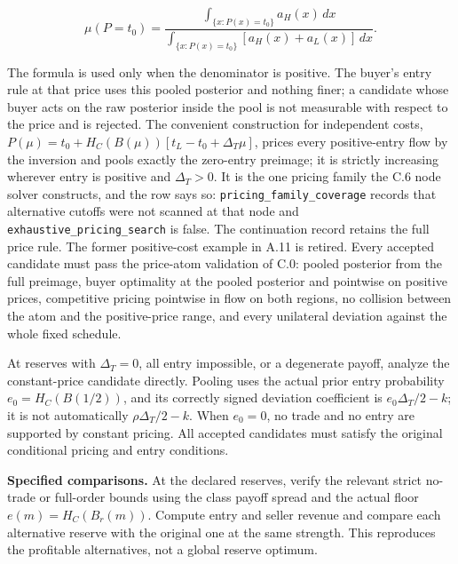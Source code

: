 \documentclass[
  11pt,
]{article}
\begin{document}
\[
\mu(P=t_0)=\frac{\int_{\{x:P(x)=t_0\}}a_H(x)\,dx}
{\int_{\{x:P(x)=t_0\}}[a_H(x)+a_L(x)]\,dx}.
\tag{OA.79}\label{eq:oa-oa-79}
\]

The formula is used only when the denominator is positive. The buyer's
entry rule at that price uses this pooled posterior and nothing finer; a
candidate whose buyer acts on the raw posterior inside the pool is not
measurable with respect to the price and is rejected. The convenient
construction for independent costs,
\(P(\mu)=t_0+H_C(B(\mu))[t_L-t_0+\Delta_T\mu]\), prices every
positive-entry flow by the inversion and pools exactly the zero-entry
preimage; it is strictly increasing wherever entry is positive and
\(\Delta_T>0\). It is the one pricing family the C.6 node solver
constructs, and the row says so: \texttt{pricing\_family\_coverage}
records that alternative cutoffs were not scanned at that node and
\texttt{exhaustive\_pricing\_search} is false. The continuation record
retains the full price rule. The former positive-cost example in A.11 is
retired. Every accepted candidate must pass the price-atom validation of
C.0: pooled posterior from the full preimage, buyer optimality at the
pooled posterior and pointwise on positive prices, competitive pricing
pointwise in flow on both regions, no collision between the atom and the
positive-price range, and every unilateral deviation against the whole
fixed schedule.

At reserves with \(\Delta_T=0\), all entry impossible, or a degenerate
payoff, analyze the constant-price candidate directly. Pooling uses the
actual prior entry probability \(e_0=H_C(B(1/2))\), and its correctly
signed deviation coefficient is \(e_0\Delta_T/2-k\); it is not
automatically \(\rho\Delta_T/2-k\). When \(e_0=0\), no trade and no
entry are supported by constant pricing. All accepted candidates must
satisfy the original conditional pricing and entry conditions.

\textbf{Specified comparisons.} At the declared reserves, verify the
relevant strict no-trade or full-order bounds using the class payoff
spread and the actual floor \(e(m)=H_C(B_r(m))\). Compute entry and
seller revenue and compare each alternative reserve with the original
one at the same strength. This reproduces the profitable alternatives,
not a global reserve optimum.


\end{document}
